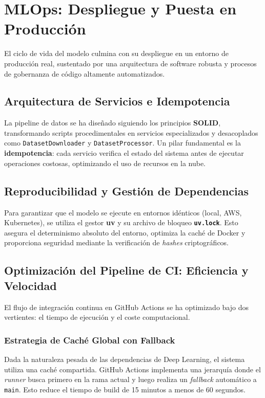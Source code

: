 \section{MLOps: Despliegue y Puesta en Producción}
\label{sec:mlops}

El ciclo de vida del modelo culmina con su despliegue en un entorno de producción real, sustentado por una arquitectura de software robusta y procesos de gobernanza de código altamente automatizados.

\subsection{Arquitectura de Servicios e Idempotencia}
La pipeline de datos se ha diseñado siguiendo los principios \textbf{SOLID}, transformando scripts procedimentales en servicios especializados y desacoplados como \texttt{DatasetDownloader} y \texttt{DatasetProcessor}. Un pilar fundamental es la \textbf{idempotencia}: cada servicio verifica el estado del sistema antes de ejecutar operaciones costosas, optimizando el uso de recursos en la nube.

\subsection{Reproducibilidad y Gestión de Dependencias}
Para garantizar que el modelo se ejecute en entornos idénticos (local, AWS, Kubernetes), se utiliza el gestor \textbf{uv} y su archivo de bloqueo \textbf{\texttt{uv.lock}}. Esto asegura el determinismo absoluto del entorno, optimiza la caché de Docker y proporciona seguridad mediante la verificación de \textit{hashes} criptográficos.

\subsection{Optimización del Pipeline de CI: Eficiencia y Velocidad}
El flujo de integración continua en GitHub Actions se ha optimizado bajo dos vertientes: el tiempo de ejecución y el coste computacional.

\subsubsection{Estrategia de Caché Global con Fallback}
Dada la naturaleza pesada de las dependencias de Deep Learning, el sistema utiliza una caché compartida. GitHub Actions implementa una jerarquía donde el \textit{runner} busca primero en la rama actual y luego realiza un \textit{fallback} automático a \texttt{main}. Esto reduce el tiempo de build de 15 minutos a menos de 60 segundos.

